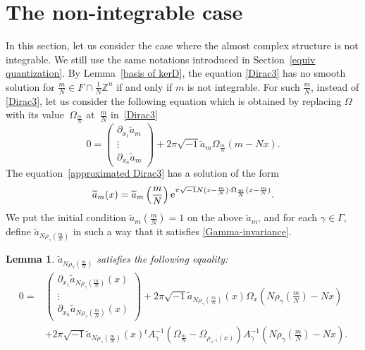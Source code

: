 \documentclass[10pt,a4paper]{amsart}
\numberwithin{equation}{section}
\newtheorem{Lemma}[Theorem]{Lemma}
\newcommand{\Z}{\mathbb{Z}}
\renewcommand{\tilde}{\widetilde}
\begin{document}
\section{The non-integrable case}\label{approximation}
In this section, let us consider the case where the almost complex structure is not integrable. We still use the same notations introduced in Section~\ref{equiv quantization}.
By Lemma~\ref{basis of kerD}, the equation \eqref{Dirac3} has no smooth solution for $\frac{m}{N}\in F\cap \frac{1}{N}\Z^n$ if and only if $m$ is not integrable. For such $\frac{m}{N}$, instead of \eqref{Dirac3}, let us consider the following equation which is obtained by replacing $\Omega$ with its value~$\Omega_{\frac{m}{N}}$ at~$\frac{m}{N}$ in~\eqref{Dirac3}
\begin{equation}\label{approximated Dirac3}
0=
\begin{pmatrix}
\partial_{x_1}{\tilde a}_m\\
\vdots \\
\partial_{x_n}{\tilde a}_m
\end{pmatrix}
+2\pi\sqrt{-1}{\tilde a}_m\Omega_{\frac{m}{N}}
(m-Nx).
\end{equation}
The equation~\eqref{approximated Dirac3} has a solution of the form
\begin{equation*}
{\tilde a}_m(x)={\tilde a}_m\left(\frac{m}{N}\right){\rm e}^{\pi\sqrt{-1}N(x-\frac{m}{N})\cdot \Omega_{\frac{m}{N}}(x-\frac{m}{N})}.
\end{equation*}
We put the initial condition ${\tilde a}_m(\frac{m}{N})=1$ on the above ${\tilde a}_m$, and for each $\gamma \in \Gamma$, define ${\tilde a}_{N\rho_\gamma (\frac{m}{N})}$ in such a way that it satisfies \eqref{Gamma-invariance}.
\begin{Lemma}
${\tilde a}_{N\rho_\gamma (\frac{m}{N})}$ satisfies the following equality:
\begin{align}
0={}&
\begin{pmatrix}
\partial_{x_1}{\tilde a}_{N\rho_\gamma (\frac{m}{N})}(x)\\
\vdots \\
\partial_{x_n}{\tilde a}_{N\rho_\gamma (\frac{m}{N})}(x)
\end{pmatrix}
+2\pi\sqrt{-1}{\tilde a}_{N\rho_\gamma (\frac{m}{N})}(x)\Omega_x \left({N\rho_\gamma \left(\frac{m}{N}\right)}-Nx\right) \nonumber \\
&+2\pi\sqrt{-1}{\tilde a}_{N\rho_\gamma (\frac{m}{N})}(x){}^tA_{\gamma}^{-1}( \Omega_{\frac{m}{N}}-\Omega_{\rho_{\gamma^{-1}}(x)}) A_{\gamma}^{-1}\left({N\rho_\gamma \left(\frac{m}{N}\right)}-Nx\right).\label{approximated DE for a_m}
\end{align}
\end{Lemma}
\end{document}
